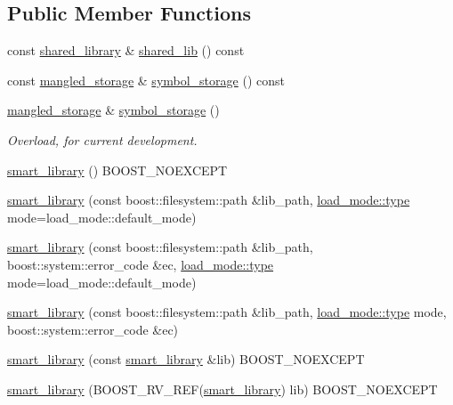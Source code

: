 \subsection*{Public Member Functions}
\begin{DoxyCompactItemize}
\item 
const \hyperlink{a01708}{shared\+\_\+library} \& \hyperlink{a01712_a83948260b41f1b64cd1227da53954862}{shared\+\_\+lib} () const
\item 
const \hyperlink{a01364}{mangled\+\_\+storage} \& \hyperlink{a01712_ae0f3bc6ca8cd617e7042457823d9f679}{symbol\+\_\+storage} () const
\item 
\mbox{\label{a01712_acfa6c8fc1336c5e9c153f72125c13998}} 
\hyperlink{a01364}{mangled\+\_\+storage} \& \hyperlink{a01712_acfa6c8fc1336c5e9c153f72125c13998}{symbol\+\_\+storage} ()
\begin{DoxyCompactList}\small\item\em Overload, for current development. \end{DoxyCompactList}\item 
\hyperlink{a01712_af1fa4c4ed871e889f92f4c11d574d91f}{smart\+\_\+library} () B\+O\+O\+S\+T\+\_\+\+N\+O\+E\+X\+C\+E\+PT
\item 
\hyperlink{a01712_af88521398a2110952dd5d0820b3b4deb}{smart\+\_\+library} (const boost\+::filesystem\+::path \&lib\+\_\+path, \hyperlink{a00272_a1918a602801479bc0bade54ff5665129}{load\+\_\+mode\+::type} mode=load\+\_\+mode\+::default\+\_\+mode)
\item 
\hyperlink{a01712_a9f3200c39d61f10b1a3001adbf2ecd0b}{smart\+\_\+library} (const boost\+::filesystem\+::path \&lib\+\_\+path, boost\+::system\+::error\+\_\+code \&ec, \hyperlink{a00272_a1918a602801479bc0bade54ff5665129}{load\+\_\+mode\+::type} mode=load\+\_\+mode\+::default\+\_\+mode)
\item 
\hyperlink{a01712_a941e7e08eaf01af2d6fd83f04465b4b6}{smart\+\_\+library} (const boost\+::filesystem\+::path \&lib\+\_\+path, \hyperlink{a00272_a1918a602801479bc0bade54ff5665129}{load\+\_\+mode\+::type} mode, boost\+::system\+::error\+\_\+code \&ec)
\item 
\hyperlink{a01712_aba01915dd665585b9a694878a8f2d9b8}{smart\+\_\+library} (const \hyperlink{a01712}{smart\+\_\+library} \&lib) B\+O\+O\+S\+T\+\_\+\+N\+O\+E\+X\+C\+E\+PT
\item 
\hyperlink{a01712_a4788c9d72aa2f5108d6273b0ec6cc5d9}{smart\+\_\+library} (B\+O\+O\+S\+T\+\_\+\+R\+V\+\_\+\+R\+EF(\hyperlink{a01712}{smart\+\_\+library}) lib) B\+O\+O\+S\+T\+\_\+\+N\+O\+E\+X\+C\+E\+PT

\end{DoxyCompactItemize}
